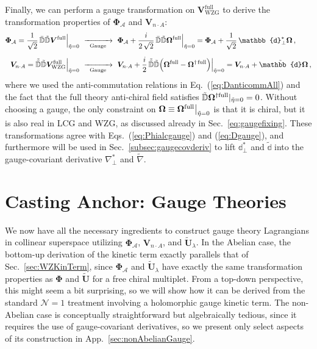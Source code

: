 \documentclass[12pt,document,nofootinbib,superscriptaddress,onecolumn,preprintnumbers,balancelastpage]{article}
\newcommand{\PP}{\mathbb{d}}
\newcommand{\gauge}{\,\,\xrightarrow[\hspace{5pt}\text{Gauge}\hspace{5pt}]{}\,\,}
\DeclareRobustCommand{\Sec}[1]{Sec.~\ref{#1}}
\DeclareRobustCommand{\App}[1]{App.~\ref{#1}}
\DeclareRobustCommand{\Eq}[1]{Eq.~(\ref{#1})}
\DeclareRobustCommand{\Eqs}[2]{Eqs.~(\ref{#1}) and (\ref{#2})}
\newcommand{\bPhi}{ \boldsymbol \Phi}
\newcommand{\bV}{ \boldsymbol V}
\newcommand{\bD}{ \boldsymbol{V}_{n \cdot A}}
\newcommand{\bPhialc}{ \boldsymbol{\Phi}_\alc}
\newcommand{\bU}{ \tilde{\boldsymbol U}}
\newcommand{\D}{\mathbb{D}}
\newcommand{\RCA}{\boldsymbol{\Omega}}
\newcommand{\alc}{\mathcal{A}}
\begin{document}
\begin{spacing}{1.2}
Finally, we can perform a gauge transformation on $\bV_\text{WZG}^\text{full}$ to derive the transformation properties of $\bPhialc$ and $\bD$: 
%
\begin{align}
\bPhialc  = \frac{1}{\sqrt{2}}\, \bar{\D} \tilde{\D}  \bV^{\rm full} \Big|_{\tilde{\eta} = 0} & \gauge \bPhialc +  \frac{i}{2\, \sqrt{2}}\, \bar{\D} \tilde{\D}  \RCA^{\rm full} \Big|_{\tilde{\eta} = 0} = \bPhialc + \frac{1}{\sqrt{2}}\,\PP_\perp^* \RCA \nonumber \,, \\[6pt]
\bD = \tilde{\bar{\D}} \tilde{\D} \bV_\text{WZG}^{\rm full} \Big|_{\tilde{\eta} = 0}  & \gauge \bD  + \frac{i}{2}\, \tilde{\bar{\D}} \tilde{\D} \Big( \RCA^{\rm full} - \RCA^{\dagger \rm \, full} \Big) \Big|_{\tilde{\eta} = 0} = \bD + \tilde{\PP} \RCA \, ,
\end{align}
%
where we used the anti-commutation relations in \Eq{eq:DanticommAll} and the fact that the full theory anti-chiral field satisfies $\tilde{\D} \RCA^{\dagger \rm full} |_{\tilde{\eta} = 0} = 0$. 
%
Without choosing a gauge, the only constraint on $\RCA \equiv \RCA^{\rm full} \big|_{\tilde{\eta} = 0}$ is that it is chiral, but it is also real in LCG and WZG, as discussed already in \Sec{eq:gaugefixing}.
%
These transformations agree with \Eqs{eq:Phialcgauge}{eq:Dgauge}, and furthermore will be used in \Sec{subsec:gaugecovderiv} to lift $\PP_\perp^*$ and $\tilde{\PP}$ into the gauge-covariant derivative $\nabla_\perp^*$ and $\tilde{\nabla}$.



\section{Casting Anchor: Gauge Theories}
\label{sec:AbelianGaugeTheory}

We now have all the necessary ingredients to construct gauge theory Lagrangians in collinear superspace utilizing $\bPhialc$, $\bD$, and $\bU_\lambda$.
%
In the Abelian case, the bottom-up derivation of the kinetic term exactly parallels that of \Sec{sec:WZKinTerm}, since $\bPhialc$ and $\bU_\lambda$ have exactly the same transformation properties as $\bPhi$ and $\bU$ for a free chiral multiplet.
%
From a top-down perspective, this might seem a bit surprising, so we will show how it can be derived from the standard $\mathcal{N} = 1$ treatment involving a holomorphic gauge kinetic term.
%
The non-Abelian case is conceptually straightforward but algebraically tedious, since it requires the use of gauge-covariant derivatives, so we present only select aspects of its construction in \App{sec:nonAbelianGauge}.



\end{spacing}
\end{document}
